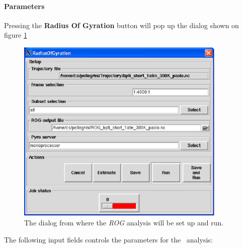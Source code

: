 \documentclass[a4paper,11pt]{report}
\begin{document}
\paragraph{Parameters\\}
\label{rog_parameters}
Pressing the \textbf{Radius Of Gyration} button will pop up the dialog shown on figure \ref{fig:rog}
\begin{figure}[h!]
\begin{center}
\includegraphics[width=10cm]{Figures/rog.eps}
\end{center}
\caption[The \textit{ROG} analysis dialog]{The dialog from where the \textit{ROG} analysis will be set up and run.}
\label{fig:rog}
\end{figure}   

The following input fields controls the parameters for the \ROG\ analysis:
\end{document}
